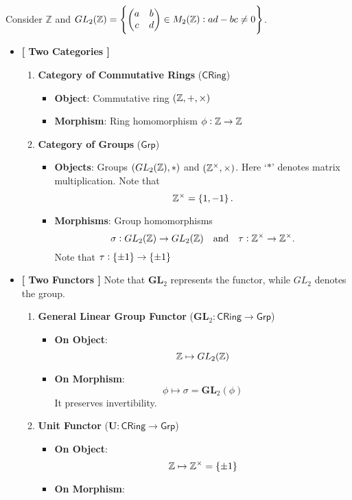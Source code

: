 \begin{example}
Consider $\mathbb{Z}$ and $GL_2(\mathbb{Z})=\set{\begin{pmatrix}
		a & b \\ c & d
\end{pmatrix}\in M_{2}(\mathbb{Z}):ad-bc\neq 0}$.
\begin{itemize}
	\item[] \textbf{[ Two Categories ]}
	\begin{enumerate}
		\item \textbf{Category of Commutative Rings} ($\mathsf{CRing}$)
		\begin{itemize}
			\item \textbf{Object}: Commutative ring $(\mathbb{Z},+,\times)$
			\item \textbf{Morphism}: Ring homomorphism $\phi:\mathbb{Z}\to \mathbb{Z}$
		\end{itemize}
		\item \textbf{Category of Groups} ($\mathsf{Grp}$)
		\begin{itemize}
			\item \textbf{Objects}: Groups $(GL_2(\mathbb{Z}),*)$ and $(\mathbb{Z}^\times,\times)$. Here `$*$' denotes matrix multiplication. Note that \[
			\mathbb{Z}^\times=\set{1,-1}.
			\]
			\item \textbf{Morphisms}: Group homomorphisms \[
			\sigma:GL_2(\mathbb{Z})\to GL_2(\mathbb{Z})\quad\text{and}\quad\tau:\mathbb{Z}^\times\to\mathbb{Z}^\times.
			\] Note that $\tau:\set{\pm1}\to\set{\pm1}$
		\end{itemize}
	\end{enumerate}
	\newpage
	\item[] \textbf{[ Two Functors ]} Note that $\mathbf{GL}_2$ represents the functor, while $GL_2$ denotes the group.
	\begin{enumerate}
		\item \textbf{General Linear Group Functor} ($\mathbf{GL}_2:\mathsf{CRing}\to\mathsf{Grp}$)
		\begin{itemize}
			\item \textbf{On Object}: \[
			\mathbb{Z}\mapsto GL_2(\mathbb{Z})
			\]
			\item \textbf{On Morphism}: \[
			\phi\mapsto\sigma=\mathbf{GL}_2(\phi)
			\] It preserves invertibility.
		\end{itemize}
		\item \textbf{Unit Functor} ($\mathbf{U}:\mathsf{CRing}\to\mathsf{Grp}$)
		\begin{itemize}
			\item \textbf{On Object}: \[
			\mathbb{Z}\mapsto \mathbb{Z}^{\times}=\set{\pm 1}
			\]
			\item \textbf{On Morphism}: \[
\]
\end{itemize}
\end{enumerate}
\end{itemize}
\end{example}
